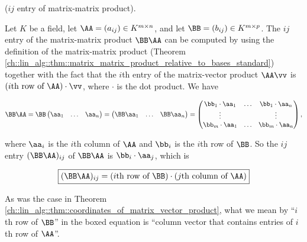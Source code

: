 \begin{theorem}
\label{ch::lin_alg::thm::coordinates_of_matrix_matrix_product}

    ($ij$ entry of matrix-matrix product). 
    
    Let $K$ be a field, let $\AA = (a_{ij}) \in K^{m \times n}$, and let $\BB = (b_{ij}) \in K^{m \times p}$. The $ij$ entry of the matrix-matrix product $\BB \AA$ can be computed by using the definition of the matrix-matrix product (Theorem \ref{ch::lin_alg::thm::matrix_matrix_product_relative_to_bases_standard}) together with the fact that the $i$th entry of the matrix-vector product $\AA \vv$ is $(\text{$i$th row of $\AA$}) \cdot \vv$, where $\cdot$ is the dot product. We have
    
    \begin{align*}
        \BB \AA
        = 
        \BB
        \begin{pmatrix}
            \aa_1 & \hdots & \aa_n
        \end{pmatrix}
        =
        \begin{pmatrix}
            \BB \aa_1 & \hdots & \BB \aa_n
        \end{pmatrix}
        =
        \begin{pmatrix}
            \bb_1 \cdot \aa_1 & \hdots & \bb_1 \cdot \aa_n \\
            \vdots & & \vdots \\
            \bb_m \cdot \aa_1 & \hdots & \bb_m \cdot \aa_n
        \end{pmatrix},
    \end{align*}
    
    where $\aa_i$ is the $i$th column of $\AA$ and $\bb_i$ is the $i$th row of $\BB$. So the $ij$ entry $(\BB \AA)_{ij}$ of $\BB \AA$ is $\bb_i \cdot \aa_j$, which is
    
    \begin{align*}
        \boxed
        {
            (\BB \AA)_{ij} = (\text{$i$th row of $\BB$}) \cdot (\text{$j$th column of $\AA$})
        }
    \end{align*}
    
    As was the case in Theorem \ref{ch::lin_alg::thm::coordinates_of_matrix_vector_product}, what we mean by ``$i$th row of $\BB$'' in the boxed equation is ``column vector that contains entries of $i$th row of $\AA$''.
\end{theorem}

